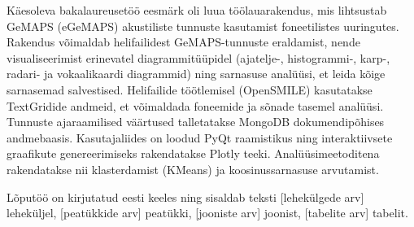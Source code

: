 Käesoleva bakalaureusetöö eesmärk oli luua töölauarakendus, mis lihtsustab GeMAPS (eGeMAPS) akustiliste tunnuste kasutamist foneetilistes uuringutes. Rakendus võimaldab helifailidest GeMAPS-tunnuste eraldamist, nende visualiseerimist erinevatel diagrammitüüpidel (ajatelje-, histogrammi-, karp-, radari- ja vokaalikaardi diagrammid) ning sarnasuse analüüsi, et leida kõige sarnasemad salvestised. Helifailide töötlemisel (OpenSMILE) kasutatakse TextGridide andmeid, et võimaldada foneemide ja sõnade tasemel analüüsi. Tunnuste ajaraamilised väärtused talletatakse MongoDB dokumendipõhises andmebaasis. Kasutajaliides on loodud PyQt raamistikus ning interaktiivsete graafikute genereerimiseks rakendatakse Plotly teeki. Analüüsimeetoditena rakendatakse nii klasterdamist (KMeans) ja koosinussarnasuse arvutamist.

Lõputöö on kirjutatud eesti keeles ning sisaldab teksti [lehekülgede arv] leheküljel, [peatükkide arv] peatükki, [jooniste arv] joonist, [tabelite arv] tabelit.